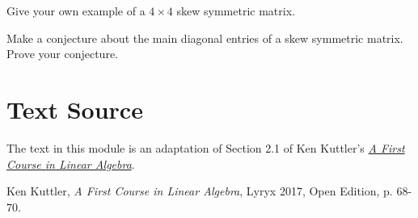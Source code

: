 \documentclass{ximera}
\begin{document}
\begin{problem}Give your own example of a $4\times 4$ skew symmetric matrix.
\end{problem}

\begin{problem} Make a conjecture about the main diagonal entries of a skew symmetric matrix.  Prove your conjecture.
\end{problem}

\section*{Text Source}
The text in this module is an adaptation of Section 2.1 of Ken Kuttler's \href{https://open.umn.edu/opentextbooks/textbooks/a-first-course-in-linear-algebra-2017}{\it A First Course in Linear Algebra}.

Ken Kuttler, {\it  A First Course in Linear Algebra}, Lyryx 2017, Open Edition, p. 68-70.
\end{document}
